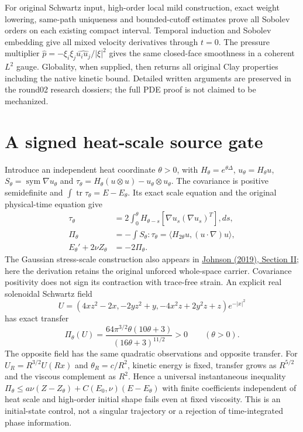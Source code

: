 \documentclass[11pt]{article}
\begin{document}
For original Schwartz input, high-order local mild construction, exact
weight lowering, same-path uniqueness and bounded-cutoff estimates prove
all Sobolev orders on each existing compact interval. Temporal induction
and Sobolev embedding give all mixed velocity derivatives through $t=0$.
The pressure multiplier
$\widehat p=-\xi_i\xi_j\widehat{u_i u_j}/|\xi|^2$ gives the same closed-face
smoothness in a coherent $L^2$ gauge. Globality, when supplied, then returns
all original Clay properties including the native kinetic bound.
Detailed written arguments are preserved in the round02 research dossiers;
the full PDE proof is not claimed to be mechanized.

\section{A signed heat-scale source gate}
Introduce an independent heat coordinate $\theta>0$, with
$H_\theta=e^{\theta\Delta}$, $u_\theta=H_\theta u$,
$S_\theta=\operatorname{sym}\nabla u_\theta$ and
$\tau_\theta=H_\theta(u\otimes u)-u_\theta\otimes u_\theta$.
The covariance is positive semidefinite and
$\int\operatorname{tr}\tau_\theta=E-E_\theta$.
Its exact scale equation and the original physical-time equation give
\[
\begin{split}
\tau_\theta&=2\int_0^\theta H_{\theta-s}
    [\nabla u_s(\nabla u_s)^T],ds,\\
\Pi_\theta&=-\int S_\theta:\tau_\theta
 =\langle H_{2\theta}u,(u\cdot\nabla)u\rangle,\\
E_\theta'+2\nu Z_\theta&=-2\Pi_\theta.
\end{split}
\]
The Gaussian stress-scale construction also appears in
\href{https://arxiv.org/pdf/1912.00293v1}{Johnson (2019), Section II};
here the derivation retains the original unforced whole-space carrier.
Covariance positivity does not sign its contraction with trace-free strain.
An explicit real solenoidal Schwartz field
\[
U=(4xz^2-2x,-2yz^2+y,-4x^2z+2y^2z+z)e^{-|x|^2}
\]
has exact transfer
\[
\Pi_\theta(U)=\frac{64\pi^{3/2}\theta(10\theta+3)}
 {(16\theta+3)^{11/2}}>0\qquad(\theta>0).
\]
The opposite field has the same quadratic observations and opposite
transfer. For $U_R=R^{3/2}U(Rx)$ and $\theta_R=c/R^2$, kinetic energy
is fixed, transfer grows as $R^{5/2}$ and the viscous complement as $R^2$.
Hence a universal instantaneous inequality
$\Pi_\theta\le a\nu(Z-Z_\theta)+C(E_0,\nu)(E-E_\theta)$ with finite
coefficients independent of heat scale and high-order initial shape fails
even at fixed viscosity. This is an initial-state control, not a singular
trajectory or a rejection of time-integrated phase information.
\end{document}
